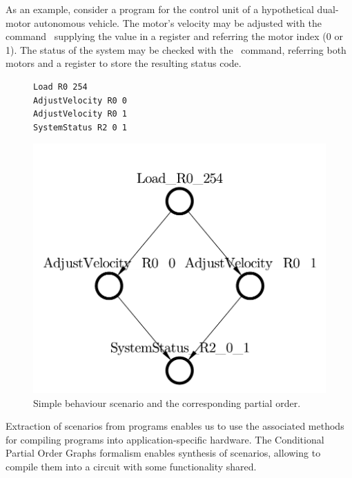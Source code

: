 As an example, consider a program for the control unit of a hypothetical dual-motor
autonomous vehicle. The motor's velocity may be adjusted with the command~
supplying the value in a register and referring the motor index (0 or 1). The status
of the system may be checked with the~ command, referring both motors
and a register to store the resulting status code.

\begin{figure}
\vspace{-10mm}
\centering
  \begin{minipage}[b]{0.5\textwidth}
\begin{verbatim}
Load R0 254
AdjustVelocity R0 0
AdjustVelocity R0 1
SystemStatus R2 0 1
\end{verbatim}
\vspace{5mm}
\end{minipage}
\begin{minipage}[b]{0.4\textwidth}
\includegraphics[scale=0.35]{img/ataed-scenario-1.pdf}
\end{minipage}
\caption{Simple behaviour scenario and the corresponding partial order.}
\end{figure}

Extraction of scenarios from programs enables us to use the associated methods for
compiling programs into application-specific hardware. The Conditional Partial
Order Graphs formalism enables synthesis of scenarios, allowing to compile them into
a circuit with some functionality shared.

